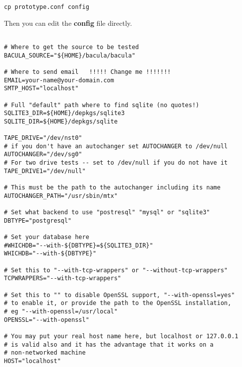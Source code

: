 \footnotesize
\begin{verbatim}
cp prototype.conf config
\end{verbatim}
\normalsize

Then you can edit the {\bf config} file directly.

\footnotesize
\begin{verbatim}
                                                                                        
# Where to get the source to be tested
BACULA_SOURCE="${HOME}/bacula/bacula"

# Where to send email   !!!!! Change me !!!!!!!
EMAIL=your-name@your-domain.com
SMTP_HOST="localhost"

# Full "default" path where to find sqlite (no quotes!)
SQLITE3_DIR=${HOME}/depkgs/sqlite3
SQLITE_DIR=${HOME}/depkgs/sqlite

TAPE_DRIVE="/dev/nst0"
# if you don't have an autochanger set AUTOCHANGER to /dev/null
AUTOCHANGER="/dev/sg0"
# For two drive tests -- set to /dev/null if you do not have it 
TAPE_DRIVE1="/dev/null"

# This must be the path to the autochanger including its name
AUTOCHANGER_PATH="/usr/sbin/mtx"

# Set what backend to use "postresql" "mysql" or "sqlite3"
DBTYPE="postgresql"

# Set your database here
#WHICHDB="--with-${DBTYPE}=${SQLITE3_DIR}"
WHICHDB="--with-${DBTYPE}"

# Set this to "--with-tcp-wrappers" or "--without-tcp-wrappers"
TCPWRAPPERS="--with-tcp-wrappers"

# Set this to "" to disable OpenSSL support, "--with-openssl=yes"
# to enable it, or provide the path to the OpenSSL installation,
# eg "--with-openssl=/usr/local"
OPENSSL="--with-openssl"

# You may put your real host name here, but localhost or 127.0.0.1
# is valid also and it has the advantage that it works on a 
# non-networked machine
HOST="localhost"
                                                                                        
\end{verbatim}
\normalsize

